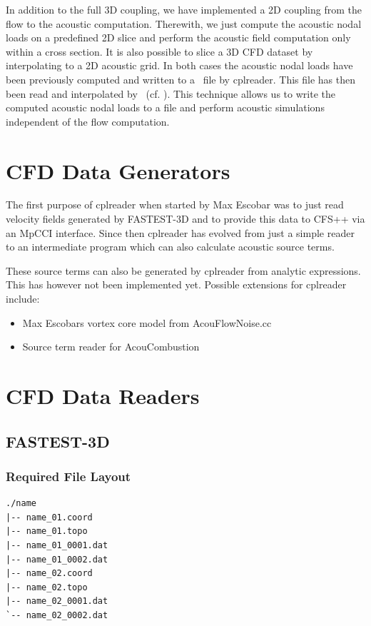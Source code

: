 \documentclass[a4paper,10pt]{article}
\begin{document}
In addition  to the full 3D coupling,  we have implemented a  2D coupling from
the flow to the acoustic  computation. Therewith, we just compute the acoustic
nodal  loads  on  a  predefined  2D  slice  and  perform  the  acoustic  field
computation only within a cross section. It is also possible to slice a 3D CFD
dataset by  interpolating to a 2D  acoustic grid.  In both  cases the acoustic
nodal loads  have been  previously computed  and written to  a \hdf\,  file by
cplreader.   This  file  has  then   been  read  and  interpolated  by  \cfs\,
(cf.  ).  This  technique  allows us  to write  the
computed  acoustic nodal  loads to  a  file and  perform acoustic  simulations
independent of the flow computation.

\newpage
\section{CFD Data Generators}

The first  purpose of cplreader when started  by Max Escobar was  to just read
velocity fields generated by FASTEST-3D and  to provide this data to CFS++ via
an MpCCI interface. Since then cplreader has evolved from just a simple reader
to an intermediate program which can also calculate acoustic source terms.

These  source  terms  can  also   be  generated  by  cplreader  from  analytic
expressions. This  has however not  been implemented yet.  Possible extensions
for cplreader include:

\begin{itemize}
\item Max Escobars vortex core model from AcouFlowNoise.cc
\item Source term reader for AcouCombustion
\end{itemize}

\newpage
\section{CFD Data Readers}
\subsection{FASTEST-3D}
\label{sec:fastest}
\subsubsection{Required File Layout}
\begin{verbatim}
./name
|-- name_01.coord
|-- name_01.topo
|-- name_01_0001.dat
|-- name_01_0002.dat
|-- name_02.coord
|-- name_02.topo
|-- name_02_0001.dat
`-- name_02_0002.dat
\end{verbatim}
\end{document}
